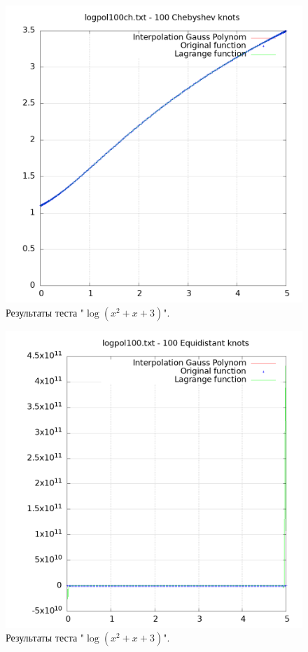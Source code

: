 \documentclass[14pt,a4paper]{extarticle}
\newcommand{\1}{\mathbbm{1}}
\begin{document}
    \begin{figure}
        \centering
        \includegraphics[scale=0.5]{Images/logpol100ch.txt.png}
        \caption{Результаты теста "$\log(x^2 + x + 3)$".}
    \end{figure}

    \begin{figure}
        \centering
        \includegraphics[scale=0.5]{Images/logpol100.txt.png}
        \caption{Результаты теста "$\log(x^2 + x + 3)$".}
    \end{figure}
\end{document}
